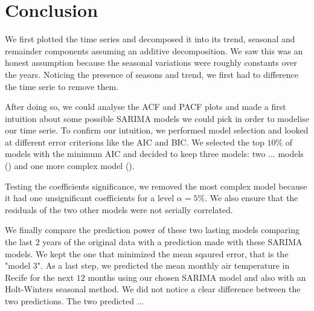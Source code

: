 \section{Conclusion}

We first plotted the time series and decomposed it into its trend, seasonal and remainder components assuming an additive decomposition. We saw this was an honest assumption because the seasonal variations were roughly constants over the years. Noticing the presence of seasons and trend, we first had to difference the time serie to remove them.

After doing so, we could analyse the ACF and PACF plots and made a first intuition about some possible SARIMA models we could pick in order to modelise our time serie. To confirm our intuition, we performed model selection and looked at different error criterions like the AIC and BIC. We selected the top $10\%$ of models with the minimum AIC and decided to keep three models: two ... models () and one more complex model ().

Testing the coefficients significance, we removed the most complex model because it had one unsignificant coefficients for a level $\alpha = 5\%$. We also ensure that the residuals of the two other models were not serially correlated.

We finally compare the prediction power of these two lasting models comparing the last $2$ years of the original data with a prediction made with these SARIMA models. We kept the one that minimized the mean sqaured error, that is the "model 3". As a last step, we predicted the mean monthly air temperature in Recife for the next $12$ months using our chosen SARIMA model and also with an Holt-Winters seasonal method. We did not notice a clear difference between the two predictions. The two predicted ...